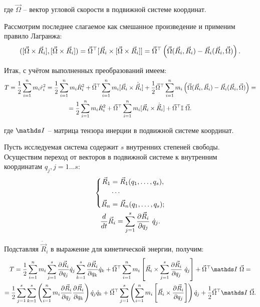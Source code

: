 \hspace*{-0.75cm} где $\vec{\Omega}$ -- вектор угловой скорости в подвижной системе координат.

Рассмотрим последнее слагаемое как смешанное произведение и применим правило Лагранжа:
\vverh
\begin{gather}
([\vec{\Omega} \times \vec{R}_i] , [\vec{\Omega} \times \vec{R}_i]) = \vec{\Omega}^\top [ \vec{R}_i \times [ \vec{\Omega} \times \vec{R}_i ]] = \vec{\Omega}^\top \left( \vec{\Omega} (\vec{R}_i, \vec{R}_i ) - \vec{R}_i (\vec{R}_i, \vec{\Omega} ) \right)
\notag .
\end{gather}

Итак, с учётом выполненных преобразований имеем:
\vverh
\begin{gather}
T = \frac{1}{2} \sum_{i=1}^{n} m_i \dot{r}_i^2 = \frac{1}{2} \sum_{i=1}^{n} m_i \dot{R}_i^2 + \vec{\Omega} ^\top \sum_{i=1}^{n} m_i[ \vec{R}_i \times \dot{\vec{R}}_i ] + \frac{1}{2} \vec{\Omega}^\top \sum_{i=1}^{n} m_i \left( \vec{\Omega} (\vec{R}_i, \vec{R}_i ) - \vec{R}_i (\vec{R}_i, \vec{\Omega} ) \right) = 
\notag \\
= \frac{1}{2} \sum_{i=1}^{n} m_i \dot{R}_i^2 + \vec{\Omega}^\top \sum_{i=1}^{n} m_i [ \vec{R}_i \times \dot{\vec{R}}_i ] + \vec{\Omega}^\top \mathbb{I} \ \vec{\Omega} \notag .
\end{gather}

\vlevo где $\bbI$ -- матрица тензора инерции в подвижной системе координат.

Пусть исследуемая система содержит $s$ внутренних степеней свободы. Осуществим переход от векторов в подвижной системе к внутренним координатам $q_j, j=1 \dots s$:
\vverh
\begin{gather}
\left\{
\begin{aligned}
\vec{R}_1 &= \vec{R}_1 (q_1, \dots, q_s), \\
&\cdots \\
\vec{R}_n &= \vec{R}_n (q_1, \dots, q_s);
\end{aligned}
\right. \notag \\
\frac{d}{dt} \vec{R}_i = \sum_{j=1}^{s} \frac{\partial \vec{R}_i}{\partial q_j} \ \dot{q}_j \notag .
\end{gather}

Подставляя $\dot{\vec{R}}_i$ в выражение для кинетической энергии, получим:
\vverh
\begin{gather}
T = \frac{1}{2} \sum_{i=1}^{n} m_i \sum_{j=1}^{s} \frac{\partial \vec{R}_i}{\partial q_j} \dot{q}_j \sum_{k=1}^{s} \frac{\partial \vec{R}_i}{\partial q_k} \dot{q}_k + \vec{\Omega}^\top \sum_{i=1}^{n} m_i \left[ \vec{R}_i \times \sum_{j=1}^{s} \frac{\partial \vec{R}_i}{\partial q_j} \ \dot{q}_j \right] + \vec{\Omega}^\top \bbI \ \vec{\Omega} = \notag \\
= \frac{1}{2} \sum_{j=1}^{s} \sum_{k=1}^{s} \left( \sum_{i=1}^{n} m_i \frac{\partial \vec{R}_i}{\partial q_j} \frac{\partial \vec{R}_i}{\partial q_k} \right) \dot{q}_j \dot{q}_k + \vec{\Omega}^\top \sum_{j=1}^{s} \left( \sum_{i=1}^{n} m_i \left[ \vec{R}_i \times \frac{\partial \vec{R}_i}{\partial q_j} \right] \right) \dot{q}_j + \frac{1}{2} \vec{\Omega}^\top \bbI \ \vec{\Omega} \notag .
\end{gather}

